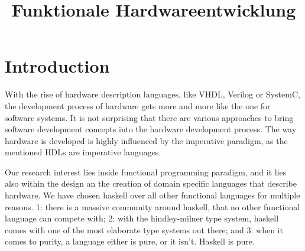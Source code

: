 \documentclass[journal]{book}
\begin{document}
\title{Funktionale Hardwareentwicklung}
\maketitle

 
%


\section{Introduction}

With the rise of hardware description languages, like VHDL, Verilog or SystemC, the development process of hardware gets more and
more like the one for software systems. It is not surprising that there are various approaches to bring software development
concepts into the hardware development process. The way hardware is developed is highly influenced by the imperative paradigm, as
the mentioned HDLs are imperative languages.

Our research interest lies inside functional programming paradigm, and it lies also within the design an the creation of domain
specific languages that describe hardware. We have chosen haskell over all other functional languages for multiple reasons. 1:
there is a massive community around haskell, that no other functional language can compete with; 2: with the hindley-milner type
system, haskell comes with one of the most elaborate type systems out there; and 3: when it comes to purity, a language either is 
pure, or it isn't. Haskell is pure.





\end{document}
